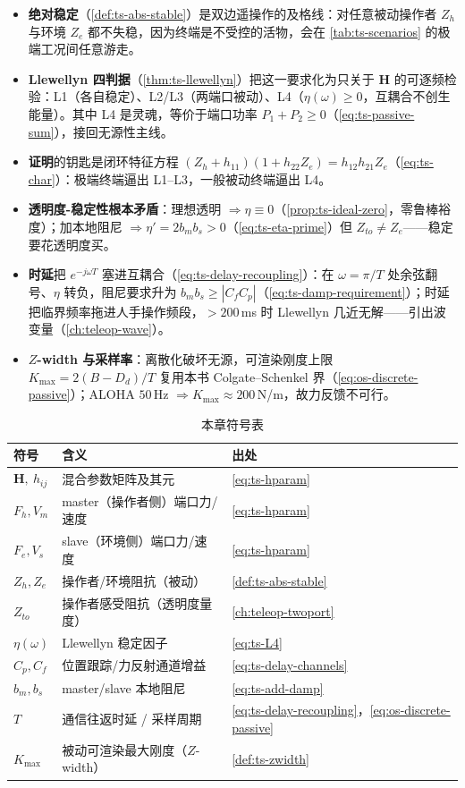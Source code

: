 \begin{itemize}
  \item \textbf{绝对稳定}（\cref{def:ts-abs-stable}）是双边遥操作的及格线：对任意被动操作者 $Z_h$ 与环境 $Z_e$ 都不失稳，因为终端是不受控的活物，会在 \cref{tab:ts-scenarios} 的极端工况间任意游走。
  \item \textbf{Llewellyn 四判据}（\cref{thm:ts-llewellyn}）把这一要求化为只关于 $\mathbf H$ 的可逐频检验：L1（各自稳定）、L2/L3（两端口被动）、L4（$\eta(\omega)\ge0$，互耦合不创生能量）。其中 L4 是灵魂，等价于端口功率 $P_1+P_2\ge0$（\cref{eq:ts-passive-sum}），接回无源性主线。
  \item \textbf{证明}的钥匙是闭环特征方程 $(Z_h+h_{11})(1+h_{22}Z_e)=h_{12}h_{21}Z_e$（\cref{eq:ts-char}）：极端终端逼出 L1--L3，一般被动终端逼出 L4。
  \item \textbf{透明度-稳定性根本矛盾}：理想透明 $\Rightarrow\eta\equiv0$（\cref{prop:ts-ideal-zero}，零鲁棒裕度）；加本地阻尼 $\Rightarrow\eta'=2b_mb_s>0$（\cref{eq:ts-eta-prime}）但 $Z_{to}\neq Z_e$——稳定要花透明度买。
  \item \textbf{时延}把 $e^{-j\omega T}$ 塞进互耦合（\cref{eq:ts-delay-recoupling}）：在 $\omega=\pi/T$ 处余弦翻号、$\eta$ 转负，阻尼要求升为 $b_mb_s\ge|C_fC_p|$（\cref{eq:ts-damp-requirement}）；时延把临界频率拖进人手操作频段，$>200\,$ms 时 Llewellyn 几近无解——引出波变量（\cref{ch:teleop-wave}）。
  \item \textbf{$Z$-width 与采样率}：离散化破坏无源，可渲染刚度上限 $K_{\max}=2(B-D_d)/T$ 复用本书 Colgate--Schenkel 界（\cref{eq:os-discrete-passive}）；ALOHA $50\,$Hz $\Rightarrow K_{\max}\approx200\,$N/m，故力反馈不可行。
\end{itemize}

\begin{table}[H]\centering\small
\caption{本章符号表}
\label{tab:ts-symbols}
\begin{tabular}{lll}
\toprule
符号 & 含义 & 出处 \\
\midrule
$\mathbf H,\ h_{ij}$ & 混合参数矩阵及其元 & \cref{eq:ts-hparam} \\
$F_h,V_m$ & master（操作者侧）端口力/速度 & \cref{eq:ts-hparam} \\
$F_e,V_s$ & slave（环境侧）端口力/速度 & \cref{eq:ts-hparam} \\
$Z_h,Z_e$ & 操作者/环境阻抗（被动） & \cref{def:ts-abs-stable} \\
$Z_{to}$ & 操作者感受阻抗（透明度量度） & \cref{ch:teleop-twoport} \\
$\eta(\omega)$ & Llewellyn 稳定因子 & \cref{eq:ts-L4} \\
$C_p,C_f$ & 位置跟踪/力反射通道增益 & \cref{eq:ts-delay-channels} \\
$b_m,b_s$ & master/slave 本地阻尼 & \cref{eq:ts-add-damp} \\
$T$ & 通信往返时延 / 采样周期 & \cref{eq:ts-delay-recoupling}，\cref{eq:os-discrete-passive} \\
$K_{\max}$ & 被动可渲染最大刚度（$Z$-width） & \cref{def:ts-zwidth} \\
\bottomrule
\end{tabular}
\end{table}

